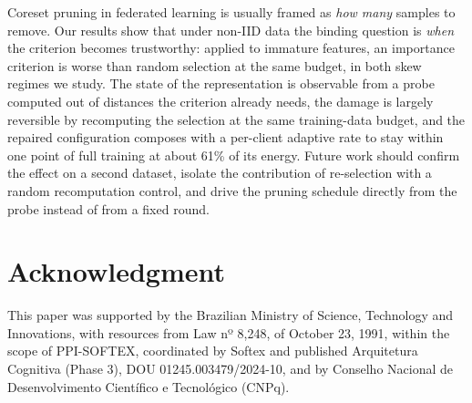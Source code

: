 \documentclass[conference]{IEEEtran}
\begin{document}
Coreset pruning in federated learning is usually framed as \emph{how many} samples to
remove. Our results show that under non-IID data the binding question is \emph{when}
the criterion becomes trustworthy: applied to immature features, an importance
criterion is worse than random selection at the same budget, in both skew regimes we
study. The state of the representation is observable from a probe computed out of
distances the criterion already needs, the damage is largely reversible by recomputing
the selection at the same training-data budget, and the repaired configuration composes with a
per-client adaptive rate to stay within one point of full training at about 61\% of
its energy.
Future work should confirm the effect on a second dataset, isolate the contribution of
re-selection with a random recomputation control, and drive the pruning schedule
directly from the probe instead of from a fixed round.

\section*{Acknowledgment}
This paper was supported by the Brazilian Ministry of Science, Technology and Innovations, with resources from Law nº 8,248, of October 23, 1991, within the scope of PPI-SOFTEX, coordinated by Softex and published Arquitetura Cognitiva (Phase 3), DOU 01245.003479/2024-10, and by Conselho Nacional de Desenvolvimento Científico e Tecnológico (CNPq).
\end{document}
